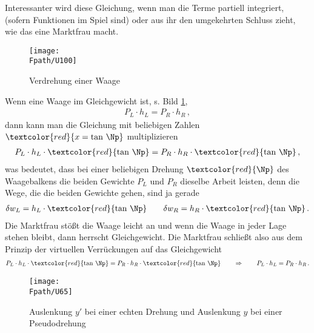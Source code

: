 {Interessanter wird diese Gleichung, wenn man die Terme partiell integriert, (sofern Funktionen im Spiel sind) oder aus ihr den umgekehrten Schluss zieht, wie das eine Marktfrau macht.
\begin{figure}[tbp]
\centering
\if {} \sidecaption \fi
\texttt{[image: \\Fpath/U100]}
\caption{Verdrehung einer Waage} \label{U100}
%
\end{figure}%

Wenn eine Waage im Gleichgewicht ist, s. Bild \ref{U100},
\begin{align}
P_L \cdot h_L = P_R \cdot h_R\,,
\end{align}
dann kann man die Gleichung mit beliebigen Zahlen $\textcolor{red}{x = \tan\,\Np}$ multiplizieren
\begin{align}
P_L \cdot h_L \cdot \textcolor{red}{\tan\,\Np}= P_R \cdot h_R\cdot \textcolor{red}{\tan\,\Np}\,,
\end{align}
was bedeutet, dass bei einer beliebigen Drehung $\textcolor{red}{\Np}$ des Waagebalkens die beiden Gewichte $P_L$ und $P_R$ dieselbe Arbeit leisten, denn die Wege, die die beiden Gewichte gehen, sind ja gerade
\begin{align}
\delta w_L = h_L \cdot \textcolor{red}{\tan\,\Np }\qquad \delta w_R = h_R\cdot \textcolor{red}{\tan\,\Np}\,.
\end{align}
Die Marktfrau st\"{o}{\ss}t die Waage leicht an und wenn die Waage in jeder  Lage stehen bleibt, dann herrscht Gleichgewicht. Die Marktfrau schlie{\ss}t also aus dem Prinzip der virtuellen Verr\"{u}ckungen auf das Gleichgewicht
\begin{align}
P_L \cdot h_L \cdot \textcolor{red}{\tan\,\Np}= P_R \cdot h_R\cdot \textcolor{red}{\tan\,\Np} \qquad \Rightarrow \qquad P_L \cdot h_L = P_R \cdot h_R\,.
\end{align}
\begin{figure}[tbp]
\centering
\if {} \sidecaption \fi
\texttt{[image: \\Fpath/U65]}
\caption{Auslenkung $y'$ bei einer echten Drehung und Auslenkung $y$ bei einer Pseudodrehung} \label{U65}
%
\end{figure}%

}
